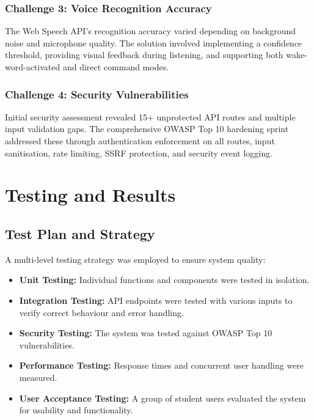 \documentclass[12pt,a4paper]{report}
\begin{document}
\subsection{Challenge 3: Voice Recognition Accuracy}

The Web Speech API's recognition accuracy varied depending on background noise and microphone quality. The solution involved implementing a confidence threshold, providing visual feedback during listening, and supporting both wake-word-activated and direct command modes.

\subsection{Challenge 4: Security Vulnerabilities}

Initial security assessment revealed 15+ unprotected API routes and multiple input validation gaps. The comprehensive OWASP Top 10 hardening sprint addressed these through authentication enforcement on all routes, input sanitisation, rate limiting, SSRF protection, and security event logging.

\chapter{Testing and Results}

\section{Test Plan and Strategy}

A multi-level testing strategy was employed to ensure system quality:

\begin{itemize}
    \item \textbf{Unit Testing:} Individual functions and components were tested in isolation.
    \item \textbf{Integration Testing:} API endpoints were tested with various inputs to verify correct behaviour and error handling.
    \item \textbf{Security Testing:} The system was tested against OWASP Top 10 vulnerabilities.
    \item \textbf{Performance Testing:} Response times and concurrent user handling were measured.
    \item \textbf{User Acceptance Testing:} A group of student users evaluated the system for usability and functionality.
\end{itemize}
\end{document}
